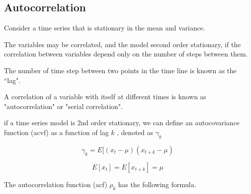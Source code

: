 \subsection*{Autocorrelation}

Consider a time series that is stationary in the mean and variance.

The variables may be correlated, and the model second order stationary, if the correlation between variables depend only on the
number of steps between them.

The number of time step between two points in the time line is known as the ``lag".

A correlation of a variable with itself at different times is known as "autocorrelation" or "serial correlation".

if a time series model is 2nd order stationary, we can define an autocovariance function (acvf) as a function of lag $k$ , denoted as $\gamma_k$

\[ \gamma_k = E[ (x_t - \mu) (x_{t+k} - \mu) \]

\[ E[x_t] = E[x_{t+k}] = \mu \]


The autocorrelation function (acf) $\rho_k$ has the following formula.
